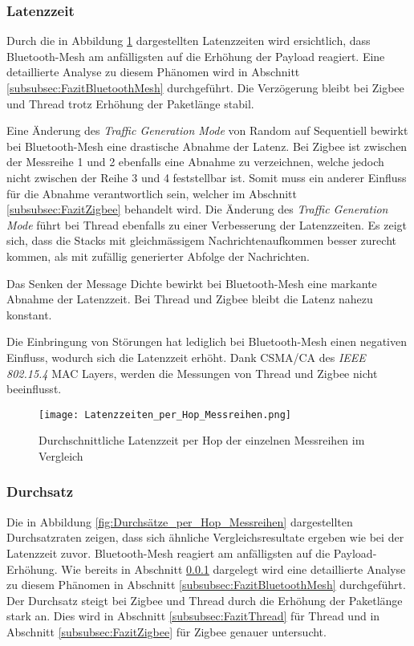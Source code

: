 \newpage
\subsubsection{Latenzzeit}\label{subsec:VergleichLatenzzeitMessreihen}
Durch die in Abbildung \ref{fig:Latenzzeiten_per_Hop_Messreihen} dargestellten Latenzzeiten wird ersichtlich, dass Bluetooth-Mesh am anfälligsten auf die Erhöhung der Payload reagiert. Eine detaillierte Analyse zu diesem Phänomen wird in Abschnitt \ref{subsubsec:FazitBluetoothMesh} durchgeführt. Die Verzögerung bleibt bei Zigbee und Thread trotz Erhöhung der Paketlänge stabil.

Eine Änderung des \textit{Traffic Generation Mode} von Random auf Sequentiell bewirkt bei Bluetooth-Mesh eine drastische Abnahme der Latenz. Bei Zigbee ist zwischen der Messreihe 1 und 2 ebenfalls eine Abnahme zu verzeichnen, welche jedoch nicht zwischen der Reihe 3 und 4 feststellbar ist. Somit muss ein anderer Einfluss für die Abnahme verantwortlich sein, welcher im Abschnitt \ref{subsubsec:FazitZigbee} behandelt wird.
Die Änderung des \textit{Traffic Generation Mode} führt bei Thread ebenfalls zu einer Verbesserung der Latenzzeiten.
Es zeigt sich, dass die Stacks mit gleichmässigem Nachrichtenaufkommen besser zurecht kommen, als mit zufällig generierter Abfolge der Nachrichten.

Das Senken der Message Dichte bewirkt bei Bluetooth-Mesh eine markante Abnahme der Latenzzeit.
Bei Thread und Zigbee bleibt die Latenz nahezu konstant.
 
Die Einbringung von Störungen hat lediglich bei Bluetooth-Mesh einen negativen Einfluss, wodurch sich die Latenzzeit erhöht.
Dank CSMA\slash CA des \textit{IEEE 802.15.4} MAC Layers, werden die Messungen von Thread und Zigbee nicht beeinflusst.

\begin{figure}[H]
	\centering
	\texttt{[image: Latenzzeiten\_per\_Hop\_Messreihen.png]}
	\caption{Durchschnittliche Latenzzeit per Hop der einzelnen Messreihen im Vergleich}\label{fig:Latenzzeiten_per_Hop_Messreihen}
\end{figure}

\subsubsection{Durchsatz}\label{subsec:VergleichDurchsatzMessreihen}

Die in Abbildung \ref{fig:Durchsätze_per_Hop_Messreihen} dargestellten Durchsatzraten zeigen, dass sich ähnliche Vergleichsresultate ergeben wie bei der Latenzzeit zuvor.
Bluetooth-Mesh reagiert am anfälligsten auf die Payload-Erhöhung. Wie bereits in Abschnitt \ref{subsec:VergleichLatenzzeitMessreihen} dargelegt wird eine detaillierte Analyse zu diesem Phänomen in Abschnitt \ref{subsubsec:FazitBluetoothMesh} durchgeführt. Der Durchsatz steigt bei Zigbee und Thread durch die Erhöhung der Paketlänge stark an. Dies wird in Abschnitt \ref{subsubsec:FazitThread} für Thread und in Abschnitt \ref{subsubsec:FazitZigbee} für Zigbee genauer untersucht.

